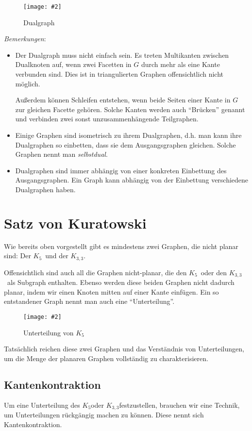 \documentclass[10pt,a4paper]{article}
\makeatletter
\def\maxwidth#1{\ifdim\Gin@nat@width>#1 #1\else\Gin@nat@width\fi}
\newcommand{\imageFigure}[4]{%
    \begin{figure}[h]%
        \centering%
        {%
            \setlength{\fboxsep}{1pt}%
            \setlength{\fboxrule}{1pt}%
            \texttt{[image: \#2]}%
        }%
        \caption{#1}%
        \label{fig:#4}%
    \end{figure}%
}
\newcommand{\Kf}{$K_5$}
\newcommand{\Kdd}{$K_{3,3}$}
\makeatother
\begin{document}
\imageFigure{Dualgraph}{dual.png}{.5}{dual}

\textit{Bemerkungen}:
\begin{itemize}
    \item Der Dualgraph muss nicht einfach sein.
        Es treten Multikanten zwischen Dualknoten auf, wenn zwei Facetten in
        $G$ durch mehr als eine Kante verbunden sind.
        Dies ist in triangulierten Graphen offensichtlich nicht möglich.

        Außerdem können Schleifen entstehen, wenn beide Seiten einer Kante in
        $G$ zur gleichen Facette gehören.
        Solche Kanten werden auch \enquote{Brücken} genannt und verbinden zwei
        sonst unzusammenhängende Teilgraphen.
    \item Einige Graphen sind isometrisch zu ihrem Dualgraphen, d.h. man kann
        ihre Dualgraphen so einbetten, dass sie dem Ausgangsgraphen gleichen.
        Solche Graphen nennt man \textit{selbstdual}.
    \item Dualgraphen sind immer abhängig von einer konkreten Einbettung des
        Ausgangsgraphen.
        Ein Graph kann abhängig von der Einbettung verschiedene Dualgraphen
        haben.
\end{itemize}


\clearpage
\section{Satz von Kuratowski}
Wie bereits oben vorgestellt gibt es mindestens zwei Graphen, die nicht planar
sind:
Der \Kf~und der \Kdd.

Offensichtlich sind auch all die Graphen nicht-planar, die den \Kf~oder den
\Kdd~als Subgraph enthalten.
Ebenso werden diese beiden Graphen nicht dadurch planar, indem wir einen Knoten
mitten auf einer Kante einfügen.
Ein so entstandener Graph nennt man auch eine \enquote{Unterteilung}.
\imageFigure{Unterteilung von \Kf}{k5-unt.png}{.2}{k5-unt}

Tatsächlich reichen diese zwei Graphen und das Verständnis von Unterteilungen,
um die Menge der planaren Graphen vollständig zu charakterisieren.
\subsection{Kantenkontraktion}
Um eine Unterteilung des \Kf oder \Kdd festzustellen, brauchen wir eine
Technik, um Unterteilungen rückgängig machen zu können.
Diese nennt sich Kantenkontraktion.
\end{document}
